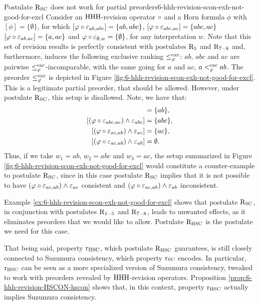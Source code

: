 \begin{xmpl}{Postulate $\mathrm{R}_{{\mathrm{SC}}}$ does not work for partial preorders}{6-hhh-revision-scon-exh-not-good-for-excl}
	Consider an ${\mathrm{HHH}}$-revision operator $\circ$
	and a Horn formula $\phi$ 
	with $[\phi]=\{\emptyset\}$,
	for which 
	$[\varphi\circ \varepsilon_{ab,abc}]=\{ab,abc\}$,
	$[\varphi\circ \varepsilon_{abc,ac}]=\{abc,ac\}$
	$[\varphi\circ \varepsilon_{ab,ac}]=\{a,ac\}$
	and $\varphi\circ \varepsilon_{\emptyset,w}=\{\emptyset\}$,
	for any interpretation $w$.
	Note that this set of revision results is perfectly consistent 
	with postulates $\mathrm{R}_{5}$ and $\mathrm{R}_{7-8}$
	and, furthermore, 
	induces the following exclusive ranking $\le^{{\operatorname{exc}}}_{\varphi}$:
	$ab$, $abc$ and $ac$ are pairwise $\le^{{\operatorname{exc}}}_{\varphi}$-incomparable,
	with the same going for $a$ and $ac$,
	$a<^{{\operatorname{exc}}}_{\varphi}ab$.
	The preorder $\le^{{\operatorname{exc}}}_{\varphi}$ is depicted
	in Figure \ref{fig:6-hhh-revision-scon-exh-not-good-for-excl}.
	This is a legitimate partial preorder, that should be allowed.
	However, under postulate $\mathrm{R}_{{\mathrm{SC}}}$, this setup
	is disallowed.
	Note, we have that: 
	\begin{align*}
		[(\phi\re \px_{ab,abc})\land\px_{ab}]&=\{ab\},\\
		[(\phi\re \px_{abc,ac})\land\px_{abc}]&=\{abc\},\\
		[(\phi\re \px_{ac,ab})\land\px_{ac}]&=\{ac\},\\
		[(\phi\re \px_{ac,ab})\land\px_{ab}]&=\emptyset.
	\end{align*}
	Thus, if we take $w_1 = ab$, $w_2 = abc$ and $w_3 = ac$,
	the setup summarized in Figure \ref{fig:6-hhh-revision-scon-exh-not-good-for-excl}
	would constitute a counter-example to 
	postulate $\mathrm{R}_{{\mathrm{SC}}}$,
	since in this case postulate $\mathrm{R}_{{\mathrm{SC}}}$
	implies that it is not possible to have 
	$(\varphi\circ \varepsilon_{ac,ab})\land\varepsilon_{ac}$ consistent
	and 
	$(\varphi\circ \varepsilon_{ac,ab})\land\varepsilon_{ab}$ inconsistent.
\end{xmpl}

Example \ref{ex:6-hhh-revision-scon-exh-not-good-for-excl} shows 
that postulate $\mathrm{R}_{{\mathrm{SC}}}$, in conjunction with postulates $\mathrm{R}_{1-5}$
and $\mathrm{R}_{7-8}$, leads to unwanted effects, as it eliminates 
preorders that we would like to allow.
Postulate $\mathrm{R}_{{\mathrm{HSC}}}$ is the postulate we need for this case.

That being said, property $\mathrm{r}_{{\mathrm{HSC}}}$, which postulate $\mathrm{R}_{{\mathrm{HSC}}}$
guarantees, is still closely connected to Suzumura consistency, which property $\mathrm{r}_{{\mathrm{SC}}}$
encodes. In particular, $\mathrm{r}_{{\mathrm{HSC}}}$ can be seen as a more specialized version of 
Suzumura consistency, tweaked to work with preorders revealed by ${\mathrm{HHH}}$-revision operators.
Proposition \ref{prop:6-hhh-revision-HSCON-hscon} shows that, in this context,
property $\mathrm{r}_{{\mathrm{HSC}}}$ actually implies Suzumura consistency.

